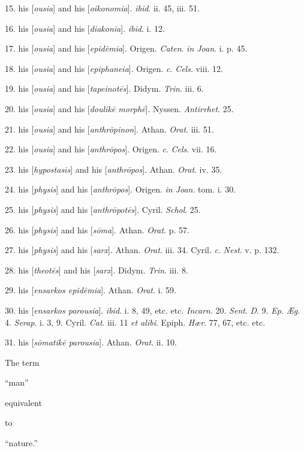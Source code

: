 15. his [\emph{ousia}] and his [\emph{oikonomia}]. \emph{ibid}.
ii. 45, iii. 51.

16. his [\emph{ousia}] and his [\emph{diakonia}]. \emph{ibid}.
i. 12.

17. his [\emph{ousia}] and his [\emph{epid\={e}mia}].
Origen. \emph{Caten}. \emph{in Joan}. i. p. 45.

18. his [\emph{ousia}] and his [\emph{epiphaneia}]. Origen. \emph{c}.
\emph{Cels}. viii. 12. 

19. his [\emph{ousia}] and his [\emph{tapeinot\={e}s}].
Didym. \emph{Trin}. iii. 6.

20. his [\emph{ousia}] and his [\emph{doulik\={e} morph\={e}}].
Nyssen. \emph{Antirrhet}. 25.

21. his [\emph{ousia}] and his [\emph{anthr\={o}pinon}].
Athan. \emph{Orat}. iii. 51.

22. his [\emph{ousia}] and his [\emph{anthr\={o}pos}].
Origen. \emph{c}. \emph{Cels}. vii. 16.

23. his [\emph{hypostasis}] and his
[\emph{anthr\={o}pos}]. Athan. \emph{Orat}. iv. 35.

24. his [\emph{physis}]
and his [\emph{anthr\={o}pos}]. Origen. \emph{in Joan}.
tom. i. 30.

25. his [\emph{physis}] and his [\emph{anthr\={o}pot\={e}s}].
Cyril. \emph{Schol}. 25.

26. his [\emph{physis}] and his [\emph{s\={o}ma}]. Athan. \emph{Orat}.
p. 57.

27. his [\emph{physis}] and his [\emph{sarx}]. Athan. \emph{Orat}.
iii. 34. Cyril. \emph{c}. \emph{Nest}. v. p. 132.

28. his [\emph{theot\={e}s}] and his [\emph{sarx}]. Didym. \emph{Trin}.
iii. 8.

29. his [\emph{ensarkos epid\={e}mia}]. Athan. \emph{Orat}.
i. 59.

30. his [\emph{ensarkos parousia}]. \emph{ibid}.
i. 8, 49, etc. etc. \emph{Incarn}. 20. \emph{Sent}. \emph{D}.
9. \emph{Ep}. \emph{Æg}. 4. \emph{Serap}. i. 3, 9. Cyril. \emph{Cat}.
iii. 11 \emph{et alibi}. Epiph. \emph{Hær}. 77, 67, etc. etc.

31. his [\emph{s\={o}matik\={e}
parousia}]. Athan. \emph{Orat}. ii. 10.

The term

``man''

equivalent

to

``nature.''

